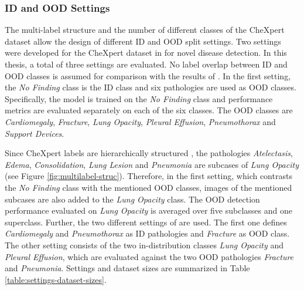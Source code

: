 \subsubsection{ID and OOD Settings}
\label{section: ID-OOD splits}
The multi-label structure and the number of different classes of the CheXpert dataset allow the design of different ID and OOD split settings.
Two settings were developed for the CheXpert dataset in \citep{Berger2021} for novel disease detection.
In this thesis, a total of three settings are evaluated. 
No label overlap between ID and OOD classes is assumed for comparison with the results of \citep{Berger2021}.
In the first setting, the \textit{No Finding} class is the ID class and six pathologies are used as OOD classes.
Specifically, the model is trained on the \textit{No Finding} class and performance metrics are evaluated separately on each of the six classes.
The OOD classes are \textit{Cardiomegaly}, \textit{Fracture}, \textit{Lung Opacity}, \textit{Pleural Effusion}, \textit{Pneumothorax} and \textit{Support Devices}.
\par
Since CheXpert labels are hierarchically structured \cite{Irvin2019}, the pathologies \textit{Atelectasis}, \textit{Edema}, \textit{Consolidation}, \textit{Lung Lesion} and \textit{Pneumonia} are subcases of \textit{Lung Opacity} (see Figure \ref{fig:multilabel-struc}).
Therefore, in the first setting, which contrasts the \textit{No Finding} class with the mentioned OOD classes, images of the mentioned subcases are also added to the \textit{Lung Opacity} class.
The OOD detection performance evaluated on \textit{Lung Opacity} is averaged over five subclasses and one superclass.
Further, the two different settings of \citep{Berger2021} are used.
The first one defines \textit{Cardiomegaly} and \textit{Pneumothorax} as ID pathologies and \textit{Fracture} as OOD class.
The other setting consists of the two in-distribution classes \textit{Lung Opacity} and \textit{Pleural Effusion}, which are evaluated against the two OOD pathologies \textit{Fracture} and \textit{Pneumonia}.
Settings and dataset sizes are summarized in Table \ref{table:settings-dataset-sizes}.
